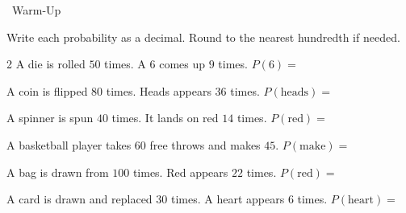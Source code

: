 \begin{practiceBox}[funGreen]{\faSun~Warm-Up}

Write each probability as a decimal. Round to the nearest hundredth if needed.

\begin{multicols}{2}
\prob A die is rolled $50$ times. A $6$ comes up $9$ times. $P(6) =$ \answerBlank[2cm]

\prob A coin is flipped $80$ times. Heads appears $36$ times. $P(\text{heads}) =$ \answerBlank[2cm]

\prob A spinner is spun $40$ times. It lands on red $14$ times. $P(\text{red}) =$ \answerBlank[2cm]

\prob A basketball player takes $60$ free throws and makes $45$. $P(\text{make}) =$ \answerBlank[2cm]

\prob A bag is drawn from $100$ times. Red appears $22$ times. $P(\text{red}) =$ \answerBlank[2cm]

\prob A card is drawn and replaced $30$ times. A heart appears $6$ times. $P(\text{heart}) =$ \answerBlank[2cm]
\end{multicols}
\end{practiceBox}

